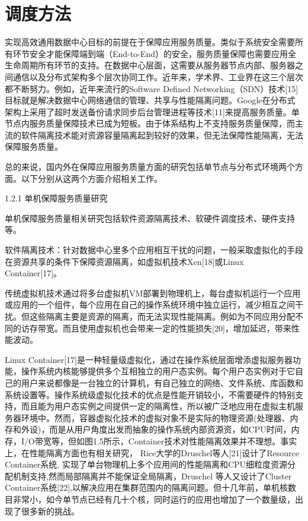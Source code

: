 \section{调度方法}
\label{sec:other}

实现高效通用数据中心目标的前提在于保障应用服务质量。类似于系统安全需要所有环节安全才能保障端到端（End-to-End）的安全，服务质量保障也需要应用全生命周期所有环节的支持。在数据中心层面，这需要从服务器节点内部、服务器之间通信以及分布式架构多个层次协同工作。近年来，学术界、工业界在这三个层次都不断努力。例如，近年来流行的Software Defined Networking（SDN）技术[15]目标就是解决数据中心网络通信的管理、共享与性能隔离问题。Google在分布式架构上采用了超时发送备份请求同步后台管理进程等技术[11]来提高服务质量。单节点内服务质量保障技术已成为短板。由于体系结构上不支持服务质量保障，而主流的软件隔离技术能对资源容量隔离起到较好的效果，但无法保障性能隔离，无法保障服务质量。

总的来说，国内外在保障应用服务质量方面的研究包括单节点与分布式环境两个方面。以下分别从这两个方面介绍相关工作。

1.2.1 单机保障服务质量研究

单机保障服务质量相关研究包括软件资源隔离技术、软硬件调度技术、硬件支持等。

软件隔离技术：针对数据中心里多个应用相互干扰的问题，一般采取虚拟化的手段在资源共享的条件下保障资源隔离，如虚拟机技术Xen[18]或Linux Container[17]。

传统虚拟机技术通过将多台虚拟机VM部署到物理机上，每台虚拟机运行一个应用或应用的一个组件，每个应用在自己的操作系统环境中独立运行，减少相互之间干扰。但这些隔离主要是资源的隔离，而无法实现性能隔离。例如为不同应用分配不同的访存带宽。而且使用虚拟机也会带来一定的性能损失[20]，增加延迟，带来性能波动。

Linux Container[17]是一种轻量级虚拟化，通过在操作系统层面增添虚拟服务器功能，操作系统内核能够提供多个互相独立的用户态实例。每个用户态实例对于它自己的用户来说都像是一台独立的计算机，有自己独立的网络、文件系统、库函数和系统设置等。操作系统级虚拟化技术的优点是性能开销较小，不需要硬件的特别支持，而且能为用户态实例之间提供一定的隔离性，所以被广泛地应用在虚拟主机服务器环境中。然而，容器虚拟化技术的虚拟对象不是实际的物理资源(处理器、内存和外设)，而是从用户角度出发而抽象的操作系统内部资源资，如CPU时间，内存，I/O带宽等，但如图1.5所示，Container技术对性能隔离效果并不理想。事实上，在性能隔离方面也有相关研究， Rice大学的Druschel等人[21]设计了Resource Container系统, 实现了单台物理机上多个应用间的性能隔离和CPU细粒度资源分配机制支持,然而局部隔离并不能保证全局隔离，Druschel 等人又设计了Cluster Container系统[22],以解决应用在集群范围内的隔离问题。但十几年前，单机核数目非常小，如今单节点已经有几十个核，同时运行的应用也增加了一个数量级，出现了很多新的挑战。

